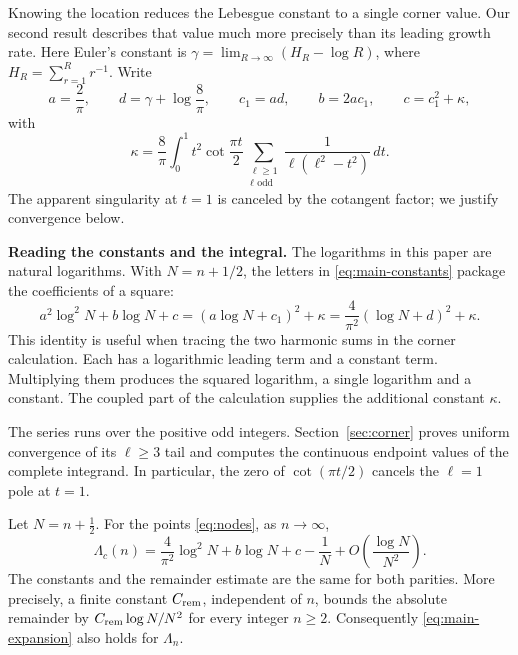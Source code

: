 Knowing the location reduces the Lebesgue constant to a single corner
value. Our second result describes that value much more precisely than
its leading growth rate. Here Euler's constant is
$\gamma=\lim_{R\to\infty}(H_R-\log R)$, where
$H_R=\sum_{r=1}^R r^{-1}$. Write
\begin{equation}\label{eq:main-constants}
 a=\frac2\pi,\qquad d=\gamma+\log\frac8\pi,\qquad
 c_1=ad,\qquad b=2ac_1,\qquad c=c_1^2+\kappa,
\end{equation}
with
\begin{equation}\label{eq:main-kappa}
 \kappa=\frac8\pi\int_0^1 t^2\cot\frac{\pi t}{2}
       \sum_{\substack{\ell\geq1\\\ell\text{ odd}}}
       \frac{1}{\ell(\ell^2-t^2)}\,dt.
\end{equation}
The apparent singularity at $t=1$ is canceled by the cotangent factor;
we justify convergence below.

\noindent\textbf{Reading the constants and the integral.}
The logarithms in this paper are natural logarithms. With $N=n+1/2$,
the letters in \eqref{eq:main-constants} package the coefficients of a square:
\[
 a^2\log^2N+b\log N+c
      =(a\log N+c_1)^2+\kappa
      =\frac4{\pi^2}(\log N+d)^2+\kappa.
\]
This identity is useful when tracing the two harmonic sums in the
corner calculation. Each has a logarithmic leading term and a constant
term. Multiplying them produces the squared logarithm, a single
logarithm and a constant. The coupled part of the calculation supplies
the additional constant $\kappa$.

The series runs over the positive odd integers. Section~\ref{sec:corner}
proves uniform convergence of its $\ell\geq3$ tail and computes the
continuous endpoint values of the complete integrand. In particular,
the zero of $\cot(\pi t/2)$ cancels the $\ell=1$ pole at $t=1$.

\begin{theorem}\label{thm:main-expansion}
Let $N=n+\tfrac12$. For the points \eqref{eq:nodes}, as $n\to\infty$,
\begin{equation}\label{eq:main-expansion}
 \Lambda_c(n)=\frac4{\pi^2}\log^2N+b\log N+c-\frac1N
            +O\!\left(\frac{\log N}{N^2}\right).
\end{equation}
The constants and the remainder estimate are the same for both parities.
More precisely, a finite constant $C_{\rm rem}$, independent of $n$, bounds the
absolute remainder by $C_{\rm rem}\log N/N^2$ for every integer $n\geq2$.
Consequently \eqref{eq:main-expansion} also holds for $\Lambda_n$.
\end{theorem}


